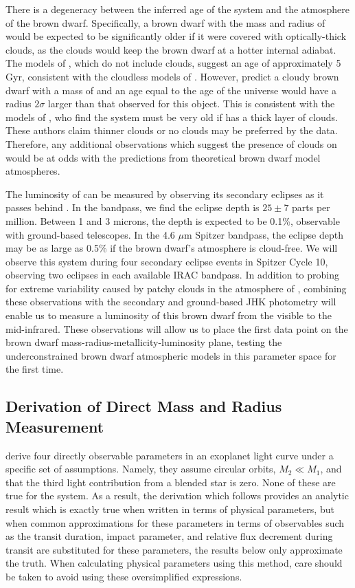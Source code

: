 There is a degeneracy between the inferred age of the system and the atmosphere of the brown dwarf.
Specifically, a brown dwarf with the mass and radius of \LC{} would be expected to be significantly older if it were covered with optically-thick clouds, as the clouds would keep the brown dwarf at a hotter internal adiabat. 
The models of \citet{Baraffe03}, which do not include clouds, suggest an age of approximately 5 Gyr, consistent with the cloudless models of \citet{Saumon08}.
However, \citet{Saumon08} predict a cloudy brown dwarf with a mass of \LC{} and an age equal to the age of the universe would have a radius $2\sigma$ larger than that observed for this object. 
This is consistent with the models of \citet{Burrows11}, who find the system must be very old if \LC{} has a thick layer of clouds.
These authors claim thinner clouds or no clouds may be preferred by the data.
Therefore, any additional observations which suggest the presence of clouds on \LC{} would be at odds with the predictions from theoretical brown dwarf model atmospheres.

The luminosity of \LC{} can be measured by observing its secondary eclipses as it passes behind \LA.
In the \itk{} bandpass, we find the eclipse depth is $25 \pm 7$ parts per million. 
Between 1 and 3 microns, the depth is expected to be 0.1\%, observable with ground-based telescopes.
In the 4.6 $\mu$m Spitzer bandpass, the eclipse depth may be as large as 0.5$\%$ if the brown dwarf's atmosphere is cloud-free. 
We will observe this system during four secondary eclipse events in Spitzer Cycle 10, observing two eclipses in each available IRAC bandpass.
In addition to probing for extreme variability caused by patchy clouds in the atmosphere of \LC, combining these observations with the \itk{} secondary and ground-based JHK photometry will enable us to measure a luminosity of this brown dwarf from the visible to the mid-infrared. 
These observations will allow us to place the first data point on the brown dwarf mass-radius-metallicity-luminosity plane, testing the underconstrained brown dwarf atmospheric models in this parameter space for the first time.


\subsection{Derivation of Direct Mass and Radius Measurement}
\label{Derivation}

\citet{Seager03} derive four directly observable parameters in an exoplanet light curve under a specific set of assumptions. 
Namely, they assume circular orbits, $M_2 \ll M_1$, and that the third light contribution from a blended star is zero.
None of these are true for the \LHS{} system. 
As a result, the derivation which follows provides an analytic result which is exactly true when written in terms of physical parameters, but when common approximations for these parameters in terms of observables such as the transit duration, impact parameter, and relative flux decrement during transit are substituted for these parameters, the results below only approximate the truth. 
When calculating physical parameters using this method, care should be taken to avoid using these oversimplified expressions.

